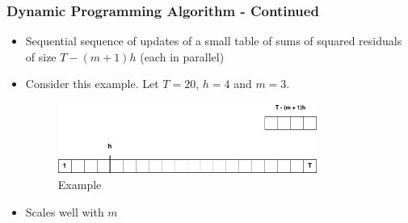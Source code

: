 \documentclass[presentation.tex]{subfiles}
\begin{document}

\begin{frame}
  \frametitle{Dynamic Programming Algorithm - Continued}
  \begin{itemize}
\item 
  Sequential sequence of updates of a small table of sums of squared residuals
  of size $T - (m+1)h$ (each in parallel)
\item 
  Consider this example.
  Let $T=20$, $h=4$ and $m=3$.
  \medskip
\begin{figure}[H]
  \centering
  \includegraphics[width=0.8\textwidth]{imgs/breakpoints_clean}
  \caption{Example}
  \label{plt_4_3}
\end{figure}
\item Scales well with $m$
  \end{itemize}
\end{frame}
\end{document}
